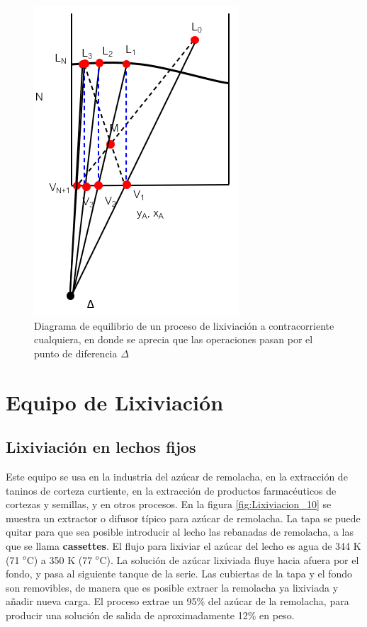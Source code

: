 \documentclass[11pt]{book}
\begin{document}
\begin{figure}[H]
    \centering
    \includegraphics{img/lixiviacion/EquilibrioLixiviacion_9.PNG}
    \caption{Diagrama de equilibrio de un proceso de lixiviación a contracorriente cualquiera, en donde se aprecia que las operaciones pasan por el punto de diferencia $\Delta$}
    \label{fig:Lixiviacion_9}
\end{figure}

\section{Equipo de Lixiviación}

\subsection{Lixiviación en lechos fijos}

Este equipo se usa en la industria del azúcar de remolacha, en la extracción de taninos de corteza curtiente, en la extracción de productos farmacéuticos de cortezas y semillas, y en otros procesos. En la figura \ref{fig:Lixiviacion_10} se muestra un extractor o difusor típico para azúcar de remolacha. La tapa se puede quitar para que sea posible introducir al lecho las rebanadas de remolacha, a las que se llama \textbf{cassettes}. El flujo para lixiviar el azúcar del lecho es agua de 344 K (71 $^o$C) a 350 K (77 $^o$C). La solución de azúcar lixiviada fluye hacia afuera por el fondo, y pasa al siguiente tanque de la serie. Las cubiertas de la tapa y el fondo son removibles, de manera que es posible extraer la remolacha ya lixiviada y añadir nueva carga. El proceso extrae un 95\% del azúcar de la remolacha, para producir una solución de salida de aproximadamente 12\% en peso.
\end{document}
